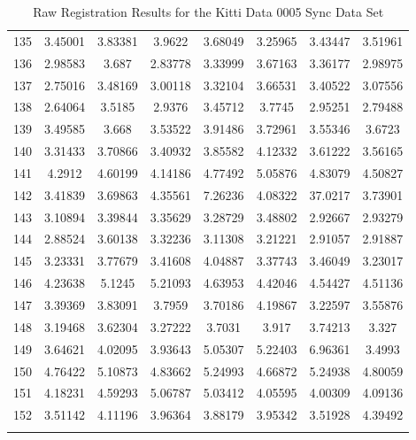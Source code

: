 \begin{center}
\begin{longtable}{cccccccc}
135 & 3.45001 & 3.83381 & 3.9622 & 3.68049 & 3.25965 & 3.43447 & 3.51961\\
136 & 2.98583 & 3.687 & 2.83778 & 3.33999 & 3.67163 & 3.36177 & 2.98975\\
137 & 2.75016 & 3.48169 & 3.00118 & 3.32104 & 3.66531 & 3.40522 & 3.07556\\
138 & 2.64064 & 3.5185 & 2.9376 & 3.45712 & 3.7745 & 2.95251 & 2.79488\\
139 & 3.49585 & 3.668 & 3.53522 & 3.91486 & 3.72961 & 3.55346 & 3.6723\\
140 & 3.31433 & 3.70866 & 3.40932 & 3.85582 & 4.12332 & 3.61222 & 3.56165\\
141 & 4.2912 & 4.60199 & 4.14186 & 4.77492 & 5.05876 & 4.83079 & 4.50827\\
142 & 3.41839 & 3.69863 & 4.35561 & 7.26236 & 4.08322 & 37.0217 & 3.73901\\
143 & 3.10894 & 3.39844 & 3.35629 & 3.28729 & 3.48802 & 2.92667 & 2.93279\\
144 & 2.88524 & 3.60138 & 3.32236 & 3.11308 & 3.21221 & 2.91057 & 2.91887\\
145 & 3.23331 & 3.77679 & 3.41608 & 4.04887 & 3.37743 & 3.46049 & 3.23017\\
146 & 4.23638 & 5.1245 & 5.21093 & 4.63953 & 4.42046 & 4.54427 & 4.51136\\
147 & 3.39369 & 3.83091 & 3.7959 & 3.70186 & 4.19867 & 3.22597 & 3.55876\\
148 & 3.19468 & 3.62304 & 3.27222 & 3.7031 & 3.917 & 3.74213 & 3.327\\
149 & 3.64621 & 4.02095 & 3.93643 & 5.05307 & 5.22403 & 6.96361 & 3.4993\\
150 & 4.76422 & 5.10873 & 4.83662 & 5.24993 & 4.66872 & 5.24938 & 4.80059\\
151 & 4.18231 & 4.59293 & 5.06787 & 5.03412 & 4.05595 & 4.00309 & 4.09136\\
152 & 3.51142 & 4.11196 & 3.96364 & 3.88179 & 3.95342 & 3.51928 & 4.39492\\
\caption{Raw Registration Results for the Kitti Data 0005 Sync Data Set}
\label{tab:kittidata0005syncFULL}
\end{longtable}
\end{center} 


